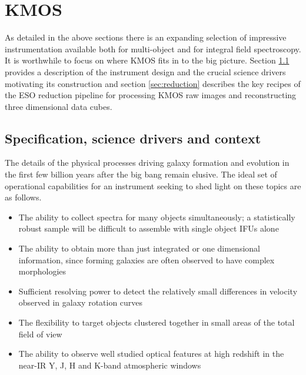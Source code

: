 \documentclass{literature}
\begin{document}
\section{KMOS}\label{sec:KMOS}
As detailed in the above sections there is an expanding selection of impressive instrumentation available both for multi-object and for integral field spectroscopy. It is worthwhile to focus on where KMOS fits in to the big picture. Section \ref{subsec:instrument} provides a description of the instrument design and the crucial science drivers motivating its construction and section \ref{sec:reduction} describes the key recipes of the ESO reduction pipeline for processing KMOS raw images and reconstructing three dimensional data cubes. 

\subsection{Specification, science drivers and context}\label{subsec:instrument}
The details of the physical processes driving galaxy formation and evolution in the first few billion years after the big bang remain elusive. The ideal set of operational capabilities for an instrument seeking to shed light on these topics are as follows. 
\begin{itemize}
	\item The ability to collect spectra for many objects simultaneously; a statistically robust sample will be difficult to assemble with single object IFUs alone 
	\item The ability to obtain more than just integrated or one dimensional information, since forming galaxies are often observed to have complex morphologies 
	\item Sufficient resolving power to detect the relatively small differences in velocity observed in galaxy rotation curves
	\item The flexibility to target objects clustered together in small areas of the total field of view 
	\item The ability to observe well studied optical features at high redshift in the near-IR Y, J, H and K-band atmospheric windows    
\end{itemize}
\end{document}
